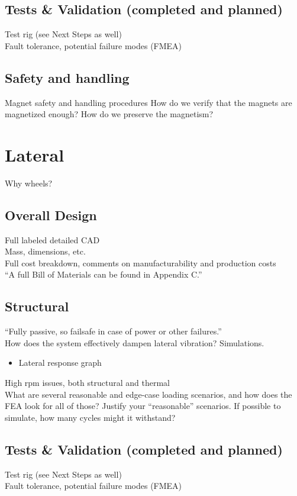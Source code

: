 \documentclass{report}
\begin{document}
    \subsection{Tests \& Validation (completed and planned)}
    Test rig (see Next Steps as well)\\
    Fault tolerance, potential failure modes (FMEA)
    
    \subsection{Safety and handling}
    Magnet safety and handling procedures
    How do we verify that the magnets are magnetized enough? How do we preserve the magnetism?
    
    \section{Lateral}
    Why wheels?
    
    \subsection{Overall Design}
    Full labeled detailed CAD\\
    Mass, dimensions, etc.\\
    Full cost breakdown, comments on manufacturability and production costs\\
    “A full Bill of Materials can be found in Appendix C.”
    
    \subsection{Structural}
    “Fully passive, so failsafe in case of power or other failures.”\\
    How does the system effectively dampen lateral vibration? Simulations.\\
    \begin{itemize}
        \item Lateral response graph
    \end{itemize}
    High rpm issues, both structural and thermal\\
    What are several reasonable and edge-case loading scenarios, and how does the FEA look for all of those? Justify your “reasonable” scenarios. If possible to simulate, how many cycles might it withstand?
    
    \subsection{Tests \& Validation (completed and planned)}
    Test rig (see Next Steps as well)\\
    Fault tolerance, potential failure modes (FMEA)
    
\end{document}
